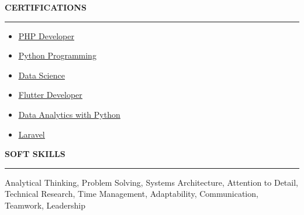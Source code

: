 \documentclass[11pt,a4paper]{article}
\newcommand{\cvlink}[2]{\textcolor{linkblue}{\underline{\href{#1}{#2}}}}
\newcommand{\cvsection}[1]{%
    \vspace{10pt}
    \noindent\textbf{\large\MakeUppercase{#1}}
    \vspace{3pt}
    \hrule
    \vspace{5pt}
}
\begin{document}
\cvsection{Certifications}
\begin{adjustwidth}{0.25in}{0.25in}
\begin{itemize}[leftmargin=0.2in, itemsep=1pt, parsep=0pt, topsep=0pt]
\item \cvlink{https://drive.google.com/file/d/1L1zCEEWwPwZR9s1vSDAtiGP-Eao2AlCV/view}{PHP Developer}
\item \cvlink{https://drive.google.com/file/d/1L0sXZx5_cM2NbqPqMxu9LT66k9NIc714/view}{Python Programming}
\item \cvlink{https://drive.google.com/file/d/1Kf9wefWCrOgYh_YBgHKEjPQgd8nGajpE/view}{Data Science}
\item \cvlink{https://drive.google.com/file/d/1JvQcnijk_f-0-ApsC_HS0jfB2LpWnHAC/view}{Flutter Developer}
\item \cvlink{https://drive.google.com/file/d/1KsSZirAqiWB7n5yVZ7ywfdsdEItlR7dt/view}{Data Analytics with Python}
\item \cvlink{https://drive.google.com/file/d/1h3f5_pZ8GIM2jUCLM_1oN1BcB0Qxi2Sg/view}{Laravel}
\end{itemize}
\end{adjustwidth}

\cvsection{Soft Skills}
\begin{adjustwidth}{0.25in}{0.25in}
Analytical Thinking, Problem Solving, Systems Architecture, Attention to Detail, Technical Research, Time Management, Adaptability, Communication, Teamwork, Leadership
\end{adjustwidth}
\end{document}
